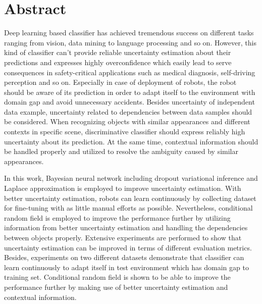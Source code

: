 
\thispagestyle{plain}

\section*{Abstract}

Deep learning based classifier has achieved tremendous success on different tasks ranging from vision, data mining to language processing and so on. However, this kind of classifier can't provide reliable uncertainty estimation about their predictions and expresses highly overconfidence which easily lead to serve consequences in safety-critical applications such as medical diagnosis, self-driving perception and so on. Especially in case of deployment of robots, the robot should be aware of its prediction in order to adapt itself to the environment with domain gap and avoid unnecessary accidents. Besides uncertainty of independent data example, uncertainty related to dependencies between data samples should be considered. When recognizing objects with similar appearances and different contexts in specific scene, discriminative classifier should express reliably high uncertainty about its prediction. At the same time, contextual information should be handled properly and utilized to resolve the ambiguity caused by similar appearances. 

In this work, Bayesian neural network including dropout variational inference and Laplace approximation is employed to improve uncertainty estimation. With better uncertainty estimation, robots can learn continuously by collecting dataset for fine-tuning with as little manual efforts as possible. Nevertheless, conditional random field is employed to improve the performance further by utilizing information from better uncertainty estimation and handling the dependencies between objects properly. Extensive experiments are performed to show that uncertainty estimation can be improved in terms of different evaluation metrics. Besides, experiments on two different datasets demonstrate that classifier can learn continuously to adapt itself in test environment which has domain gap to training set. Conditional random field is shown to be able to improve the performance further by making use of better uncertainty estimation and contextual information.

\switchlanguage{\lang} %
